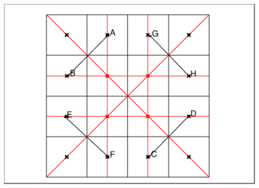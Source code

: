 \documentclass[a4paper,11pt]{book}
\begin{document}
\begin{minipage}[h]{6.5cm}
\includegraphics[width=\textwidth]{carrem4d}
\end{minipage}
\end{document}
